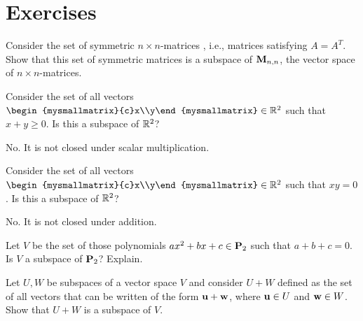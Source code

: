 \section*{Exercises}

\begin{ex}
  Consider the set of symmetric $n\times n$-matrices%
  , i.e., matrices satisfying $A=A^{T}$. Show
  that this set of symmetric matrices is a subspace of $\mathbf{M}_{n,n}$,
  the vector space of $n\times n$-matrices.
\end{ex}

\begin{ex}
  Consider the set of all vectors
  $\begin{mysmallmatrix}{c}x\\y\end{mysmallmatrix}\in\R^2$ such that
  $x+y\geq 0$. Is this a subspace of $\mathbb{R}^{2}$?
  \begin{sol}
    No. It is not closed under scalar multiplication.
  \end{sol}
\end{ex}

\begin{ex}
  Consider the set of all vectors
  $\begin{mysmallmatrix}{c}x\\y\end{mysmallmatrix}\in\R^2$ such that $xy=0$. Is
  this a subspace of $\mathbb{R}^{2}$?
  \begin{sol}
    No. It is not closed under addition.
  \end{sol}
\end{ex}

\begin{ex}
  Let $V$ be the set of those polynomials $ax^2+bx+c\in\mathbf{P}_{2}$ such
  that $a+b+c=0$. Is $V$ a subspace of $\mathbf{P}_{2}$? Explain.
\end{ex}

\begin{ex}
  Let $U,W$ be subspaces of a vector space $V$ and consider $U+W$
  defined as the set of all vectors that can be written of the form
  $\mbox{\bf u}+\mbox{\bf w}$, where $\mbox{\bf u}\in U$ and $\mbox{\bf w}\in W$. Show
  that $U+W$ is a subspace of $V$.
\end{ex}

